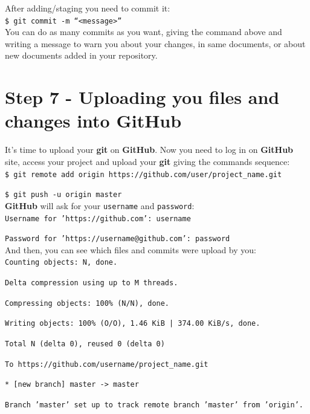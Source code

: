 \documentclass[12pt,a4paper,titlepage,brazil]{article}
\begin{document}
{After adding/staging you need to commit it:\\

\texttt{\$ git commit -m ``<message>''}\\

You can do as many commits as you want, giving the command above and writing a message to warn you about your changes, in same documents, or about new documents added in your repository.


\section{Step 7 - Uploading you files and changes into GitHub}

It's time to upload your {\bf git} on {\bf GitHub}. Now you need to log in on {\bf GitHub} site, access your project and upload your {\bf git} giving the commands sequence:\\

\texttt{\$ git remote add origin https://github.com/user/project\_name.git}

\texttt{\$ git push -u origin master}\\

{\bf GitHub} will ask for your \texttt{username} and  \texttt{password}:\\

\texttt{Username for 'https://github.com': username}

\texttt{Password for 'https://username@github.com': password}\\

And then, you can see which files and commits were upload by you:\\

\texttt{Counting objects: N, done.}
  
\texttt{Delta compression using up to M threads.}

\texttt{Compressing objects: 100\% (N/N), done.}

\texttt{Writing objects: 100\% (O/O), 1.46 KiB | 374.00 KiB/s, done.}

\texttt{Total N (delta 0), reused 0 (delta 0)}

\texttt{To https://github.com/username/project\_name.git}

\texttt{* [new branch]      master -> master}

\texttt{Branch 'master' set up to track remote branch 'master' from 'origin'.}\\

}
\end{document}
